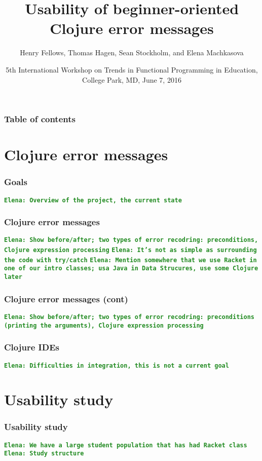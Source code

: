 \documentclass{beamer}
\newcommand{\comment}[1]{{\bf \tt  {#1}}}
\newcommand{\emcomment}[1]{\textcolor{ForestGreen}{\comment{Elena: {#1}}}}
\begin{document}
\title{Usability of beginner-oriented Clojure error messages}
\author{Henry Fellows, Thomas Hagen, Sean Stockholm, 
and Elena Machkasova}
\date{5th International Workshop on Trends in Functional Programming in Education, \\
College Park, MD, June 7, 2016}

\begin{frame}
\titlepage
\end{frame}

\begin{frame}
\frametitle{Table of contents}
\tableofcontents  
\end{frame}

\section{Clojure error messages}

\begin{frame}
\frametitle{Goals }
\emcomment{Overview of the project, the current state}
\end{frame}


\begin{frame}
\frametitle{ Clojure error messages}
\emcomment{Show before/after; two types of error recodring: preconditions, Clojure expression processing}
\emcomment{It's not as simple as surrounding the code with try/catch}
\emcomment{Mention somewhere that we use Racket in one of our intro classes; usa Java in Data Strucures, use some Clojure later}
\end{frame}

\begin{frame}
\frametitle{ Clojure error messages (cont)}
\emcomment{Show before/after; two types of error recodring: preconditions (printing the arguments), Clojure expression processing}
\end{frame}

\begin{frame}
\frametitle{ Clojure IDEs}
\emcomment{Difficulties in integration, this is not a current goal}
\end{frame}

\section{Usability study}

\begin{frame}
\frametitle{Usability study}
\emcomment{We have a large student population that has had Racket class}
\emcomment{Study structure}
\end{frame}
\end{document}

